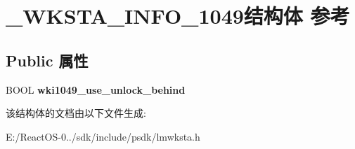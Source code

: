 \hypertarget{struct___w_k_s_t_a___i_n_f_o__1049}{}\section{\+\_\+\+W\+K\+S\+T\+A\+\_\+\+I\+N\+F\+O\+\_\+1049结构体 参考}
\label{struct___w_k_s_t_a___i_n_f_o__1049}
\subsection*{Public 属性}
\begin{DoxyCompactItemize}
\item 
\mbox{\label{struct___w_k_s_t_a___i_n_f_o__1049_aae7a697a69554441e9a4f64098599d00}} 
B\+O\+OL {\bfseries wki1049\+\_\+use\+\_\+unlock\+\_\+behind}
\end{DoxyCompactItemize}


该结构体的文档由以下文件生成\+:\begin{DoxyCompactItemize}
\item 
E\+:/\+React\+O\+S-\/0../sdk/include/psdk/lmwksta.\+h\end{DoxyCompactItemize}
